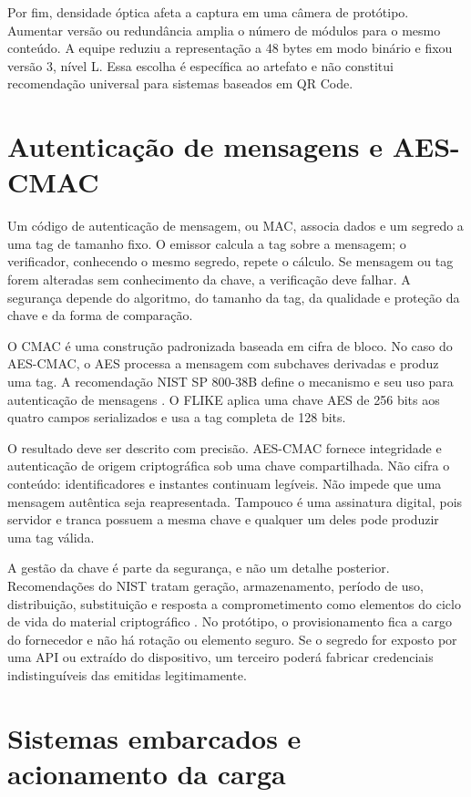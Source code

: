 Por fim, densidade óptica afeta a captura em uma câmera de protótipo. Aumentar versão ou redundância amplia o número de módulos para o mesmo conteúdo. A equipe reduziu a representação a 48 bytes em modo binário e fixou versão 3, nível L. Essa escolha é específica ao artefato e não constitui recomendação universal para sistemas baseados em QR Code.

\section{Autenticação de mensagens e AES-CMAC}

Um código de autenticação de mensagem, ou MAC, associa dados e um segredo a uma tag de tamanho fixo. O emissor calcula a tag sobre a mensagem; o verificador, conhecendo o mesmo segredo, repete o cálculo. Se mensagem ou tag forem alteradas sem conhecimento da chave, a verificação deve falhar. A segurança depende do algoritmo, do tamanho da tag, da qualidade e proteção da chave e da forma de comparação.

O CMAC é uma construção padronizada baseada em cifra de bloco. No caso do AES-CMAC, o AES processa a mensagem com subchaves derivadas e produz uma tag. A recomendação NIST SP 800-38B define o mecanismo e seu uso para autenticação de mensagens \cite{nist2005cmac}. O FLIKE aplica uma chave AES de 256 bits aos quatro campos serializados e usa a tag completa de 128 bits.

O resultado deve ser descrito com precisão. AES-CMAC fornece integridade e autenticação de origem criptográfica sob uma chave compartilhada. Não cifra o conteúdo: identificadores e instantes continuam legíveis. Não impede que uma mensagem autêntica seja reapresentada. Tampouco é uma assinatura digital, pois servidor e tranca possuem a mesma chave e qualquer um deles pode produzir uma tag válida.

A gestão da chave é parte da segurança, e não um detalhe posterior. Recomendações do NIST tratam geração, armazenamento, período de uso, distribuição, substituição e resposta a comprometimento como elementos do ciclo de vida do material criptográfico \cite{barker2020keymanagement}. No protótipo, o provisionamento fica a cargo do fornecedor e não há rotação ou elemento seguro. Se o segredo for exposto por uma API ou extraído do dispositivo, um terceiro poderá fabricar credenciais indistinguíveis das emitidas legitimamente.

\section{Sistemas embarcados e acionamento da carga}

